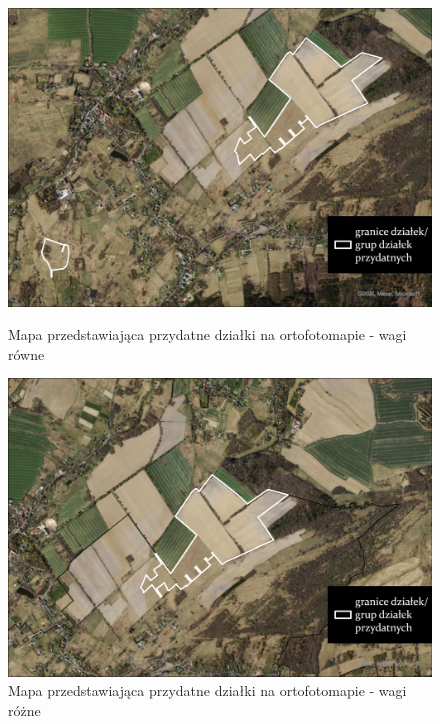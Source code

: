 \documentclass{article}
\begin{document}
\begin{figure}[H]
    \begin{minipage}[t]{0.48\textwidth}
        \centering
        \includegraphics[width=\linewidth]{img/dzialki-przydatne-ortofoto.jpg}
        \caption{Mapa przedstawiająca przydatne działki na ortofotomapie - wagi równe}
        \label{fig:dzialki-ortofoto-rowne}
    \end{minipage}
    \hfill
    \begin{minipage}[t]{0.48\textwidth}
        \centering
        \includegraphics[width=\linewidth]{img/roznewagi-dzialki-przydatne-ortofoto.jpg}
        \caption{Mapa przedstawiająca przydatne działki na ortofotomapie - wagi różne}
        \label{fig:dzialki-ortofoto-rozne}
    \end{minipage}
\end{figure}
\end{document}
